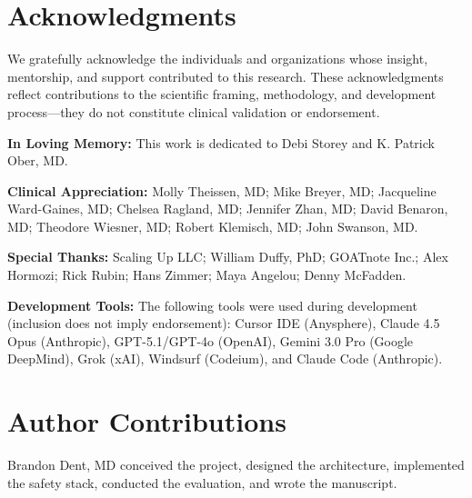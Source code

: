 \documentclass[10pt,twocolumn]{article}
\begin{document}
\section*{Acknowledgments}

We gratefully acknowledge the individuals and organizations whose insight, mentorship, and support contributed to this research. These acknowledgments reflect contributions to the scientific framing, methodology, and development process---they do not constitute clinical validation or endorsement.

\textbf{In Loving Memory:} This work is dedicated to Debi Storey and K. Patrick Ober, MD.

\textbf{Clinical Appreciation:} Molly Theissen, MD; Mike Breyer, MD; Jacqueline Ward-Gaines, MD; Chelsea Ragland, MD; Jennifer Zhan, MD; David Benaron, MD; Theodore Wiesner, MD; Robert Klemisch, MD; John Swanson, MD.

\textbf{Special Thanks:} Scaling Up LLC; William Duffy, PhD; GOATnote Inc.; Alex Hormozi; Rick Rubin; Hans Zimmer; Maya Angelou; Denny McFadden.

\textbf{Development Tools:} The following tools were used during development (inclusion does not imply endorsement): Cursor IDE (Anysphere), Claude 4.5 Opus (Anthropic), GPT-5.1/GPT-4o (OpenAI), Gemini 3.0 Pro (Google DeepMind), Grok (xAI), Windsurf (Codeium), and Claude Code (Anthropic).

\section*{Author Contributions}

Brandon Dent, MD conceived the project, designed the architecture, implemented the safety stack, conducted the evaluation, and wrote the manuscript.




\appendix






\end{document}
